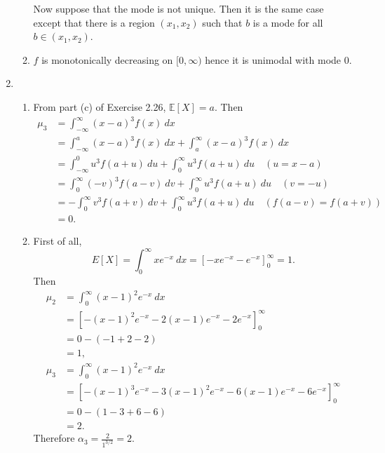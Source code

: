 \documentclass{article}
\begin{document}
\begin{enumerate}
\begin{enumerate}
        Now suppose that the mode is not unique. Then it is the same case except that there is a region 
        $(x_1, x_2)$ such that $b$ is a mode for all $b \in (x_1, x_2)$.

        \item $f$ is monotonically decreasing on $[0, \infty)$ hence it is unimodal with mode 0.
    \end{enumerate}

    \item \begin{enumerate}
        \item From part (c) of Exercise 2.26, $\mathbb{E}[X] = a$. Then 
        \begin{align*}
            \mu_3
            &= \int_{-\infty}^{\infty} (x - a)^3 f(x) \ dx \\
            &= \int_{-\infty}^{a} (x - a)^3 f(x) \ dx + \int_{a}^{\infty} (x - a)^3 f(x) \ dx \\
            &= \int_{-\infty}^{0} u^3 f(a + u) \ du + \int_{0}^{\infty} u^3 f(a + u) \ du \quad 
            (u = x - a) \\
            &= \int_{0}^{\infty} (-v)^3 f(a - v) \ dv + \int_{0}^{\infty} u^3 f(a + u) \ du \quad
            (v = -u) \\
            &= -\int_{0}^{\infty} v^3 f(a + v) \ dv + \int_{0}^{\infty} u^3 f(a + u) \ du \quad 
            (f(a - v) = f(a + v)) \\
            &= 0.
        \end{align*}

        \item First of all, 
        \[ E[X] = \int_{0}^{\infty} xe^{-x} \ dx = [-xe^{-x} - e^{-x}]_{0}^{\infty} = 1. \]
        Then 
        \begin{align*}
            \mu_2
            &= \int_{0}^{\infty} (x - 1)^2 e^{-x} \ dx \\
            &= [-(x - 1)^2 e^{-x} - 2(x - 1)e^{-x} - 2e^{-x}]_{0}^{\infty} \\
            &= 0 - (-1 + 2 - 2) \\
            &= 1, \\
            \mu_3
            &= \int_{0}^{\infty} (x - 1)^2 e^{-x} \ dx \\
            &= [-(x - 1)^3 e^{-x} - 3(x - 1)^2 e^{-x} - 6(x - 1)e^{-x} - 6e^{-x}]_{0}^{\infty} \\
            &= 0 - (1 - 3 + 6 - 6) \\
            &= 2.
        \end{align*}
        Therefore $\alpha_3 = \frac{2}{1^{3 / 2}} = 2$.


\end{enumerate}
\end{enumerate}
\end{document}
